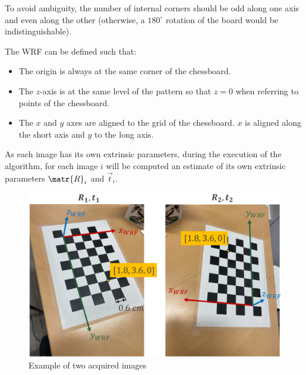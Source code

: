 \begin{description}
\begin{description}
                \begin{remark}
                    To avoid ambiguity, the number of internal corners should be odd along one axis and even along the other
                    (otherwise, a $180^\circ$ rotation of the board would be indistinguishable).
                \end{remark}

                The WRF can be defined such that:
                \begin{itemize}
                    \item The origin is always at the same corner of the chessboard.
                    \item The $z$-axis is at the same level of the pattern so that $z=0$ when referring to points of the chessboard.
                    \item The $x$ and $y$ axes are aligned to the grid of the chessboard. $x$ is aligned along the short axis and $y$ to the long axis.
                \end{itemize}

                \begin{remark}
                    As each image has its own extrinsic parameters,
                    during the execution of the algorithm, for each image $i$ will be computed
                    an estimate of its own extrinsic parameters $\matr{R}_i$ and $\vec{t}_i$.
                \end{remark}

                \begin{figure}[H]
                    \centering
                    \includegraphics[width=0.4\linewidth]{./img/_zhang_image_acquistion.pdf}
                    \caption{Example of two acquired images}
                \end{figure}
        \end{description}


\end{description}
